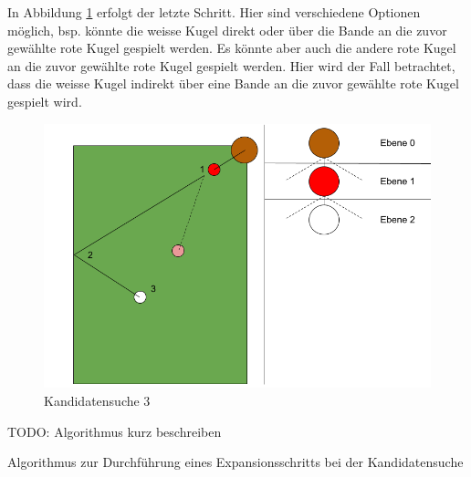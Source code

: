 In Abbildung \ref{fig:backwardsearch_3} erfolgt der letzte Schritt. Hier sind verschiedene Optionen möglich, bsp.
könnte die weisse Kugel direkt oder über die Bande an die zuvor gewählte rote Kugel gespielt werden. Es könnte aber auch
die andere rote Kugel an die zuvor gewählte rote Kugel gespielt werden. Hier wird der Fall betrachtet, dass die weisse Kugel
indirekt über eine Bande an die zuvor gewählte rote Kugel gespielt wird.
\begin{figure}[h!]
    \begin{center}
        \includegraphics[width=0.5\linewidth]{../common/03_billiard_ai/resources/13_backwardsearch_3.png}
    \end{center}
    \caption{Kandidatensuche 3}
    \label{fig:backwardsearch_3}
\end{figure}

TODO: Algorithmus kurz beschreiben

\begin{algorithm}[H]
    \DontPrintSemicolon
    \caption{Algorithmus zur Durchführung eines Expansionsschritts bei der Kandidatensuche}
    \label{alg:backward_search}
\end{algorithm}
